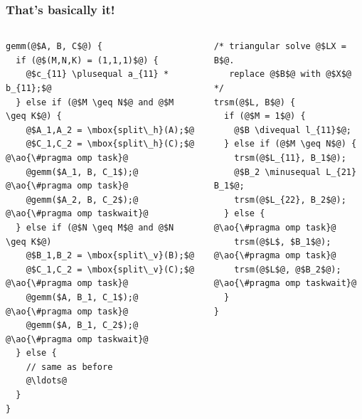 \documentclass[12pt,dvipdfmx]{beamer}
\newcommand{\plusequal}{\mbox{\tt\ += }}
\newcommand{\minusequal}{\mbox{\tt\ -= }}
\newcommand{\divequal}{\mbox{\tt\ /= }}
\newcommand{\ao}[1]{{\color{blue}#1}}
\begin{document}
\begin{frame}[fragile]
\frametitle{That's basically it!}

\begin{columns}[t]
\begin{column}{0.45\textwidth}
\begin{lstlisting}[basicstyle=\scriptsize]
gemm(@$A, B, C$@) {
  if (@$(M,N,K) = (1,1,1)$@) {
    @$c_{11} \plusequal a_{11} * b_{11};$@
  } else if (@$M \geq N$@ and @$M \geq K$@) {
    @$A_1,A_2 = \mbox{split\_h}(A);$@
    @$C_1,C_2 = \mbox{split\_h}(C);$@
@\ao{\#pragma omp task}@
    @gemm($A_1, B, C_1$);@
@\ao{\#pragma omp task}@
    @gemm($A_2, B, C_2$);@
@\ao{\#pragma omp taskwait}@
  } else if (@$N \geq M$@ and @$N \geq K$@)
    @$B_1,B_2 = \mbox{split\_v}(B);$@
    @$C_1,C_2 = \mbox{split\_v}(C);$@
@\ao{\#pragma omp task}@
    @gemm($A, B_1, C_1$);@
@\ao{\#pragma omp task}@
    @gemm($A, B_1, C_2$);@
@\ao{\#pragma omp taskwait}@
  } else {
    // same as before
    @\ldots@
  }
}
\end{lstlisting}
\end{column}

\begin{column}{0.40\textwidth}
\begin{lstlisting}[basicstyle=\scriptsize]
/* triangular solve @$LX = B$@. 
   replace @$B$@ with @$X$@ */
trsm(@$L, B$@) {
  if (@$M = 1$@) {
    @$B \divequal l_{11}$@;
  } else if (@$M \geq N$@) {
    trsm(@$L_{11}, B_1$@);
    @$B_2 \minusequal L_{21} B_1$@;
    trsm(@$L_{22}, B_2$@);
  } else {
@\ao{\#pragma omp task}@
    trsm(@$L$, $B_1$@);
@\ao{\#pragma omp task}@
    trsm(@$L$@, @$B_2$@);
@\ao{\#pragma omp taskwait}@
  }
}
\end{lstlisting}

\end{column}
\end{columns}
\end{frame}

\end{document}
